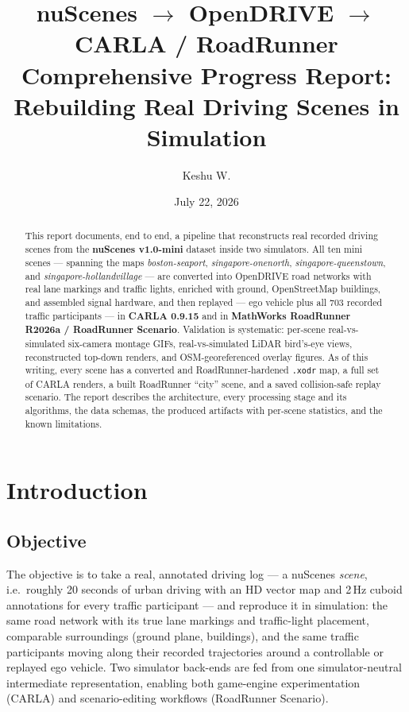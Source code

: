 \documentclass[11pt]{article}
\title{\textbf{nuScenes $\rightarrow$ OpenDRIVE $\rightarrow$ CARLA / RoadRunner}\\[6pt]
\large Comprehensive Progress Report:\\ Rebuilding Real Driving Scenes in Simulation}
\author{Keshu W.}
\date{July 22, 2026}
\newcommand{\file}[1]{\texttt{#1}}
\begin{document}
\maketitle

\begin{abstract}
\noindent
This report documents, end to end, a pipeline that reconstructs real recorded driving
scenes from the \textbf{nuScenes v1.0-mini} dataset inside two simulators. All ten mini
scenes --- spanning the maps \emph{boston-seaport}, \emph{singapore-onenorth},
\emph{singapore-queenstown}, and \emph{singapore-hollandvillage} --- are converted into
OpenDRIVE road networks with real lane markings and traffic lights, enriched with ground,
OpenStreetMap buildings, and assembled signal hardware, and then replayed --- ego vehicle
plus all 703 recorded traffic participants --- in \textbf{CARLA 0.9.15} and in
\textbf{MathWorks RoadRunner R2026a / RoadRunner Scenario}. Validation is systematic:
per-scene real-vs-simulated six-camera montage GIFs, real-vs-simulated LiDAR bird's-eye
views, reconstructed top-down renders, and OSM-georeferenced overlay figures. As of this
writing, every scene has a converted and RoadRunner-hardened \file{.xodr} map, a full
set of CARLA renders, a built RoadRunner ``city'' scene, and a saved collision-safe
replay scenario. The report describes the architecture, every processing stage and its
algorithms, the data schemas, the produced artifacts with per-scene statistics, and the
known limitations.
\end{abstract}

\tableofcontents
\clearpage

\section{Introduction}

\subsection{Objective}
The objective is to take a real, annotated driving log --- a nuScenes \emph{scene},
i.e.\ roughly 20 seconds of urban driving with an HD vector map and 2\,Hz cuboid
annotations for every traffic participant --- and reproduce it in simulation: the same
road network with its true lane markings and traffic-light placement, comparable
surroundings (ground plane, buildings), and the same traffic participants moving along
their recorded trajectories around a controllable or replayed ego vehicle. Two simulator
back-ends are fed from one simulator-neutral intermediate representation, enabling both
game-engine experimentation (CARLA) and scenario-editing workflows (RoadRunner
Scenario).
\end{document}
